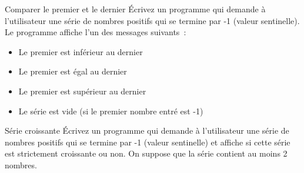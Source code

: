 \documentclass[a4paper,11pt]{article}
\begin{document}
		\begin{Exercice}{Comparer le premier et le dernier}
			\'Ecrivez un programme qui demande à l'utilisateur une série de nombres positifs 
			qui se termine par -1 (valeur sentinelle). 
			Le programme affiche l'un des messages suivants~:
			\begin{itemize}
				\item Le premier est inférieur au dernier
				\item Le premier est égal au dernier
				\item Le premier est supérieur au dernier
				\item Le série est vide (si le premier nombre entré est -1)
			\end{itemize}			
		\end{Exercice}

		\begin{Exercice}{Série croissante}
			\'Ecrivez un programme qui demande à l'utilisateur une série de nombres positifs 
			qui se termine par -1 (valeur sentinelle) et affiche si cette série est strictement croissante ou non.
			On suppose que la série contient au moins 2 nombres.
		\end{Exercice}
\end{document}
